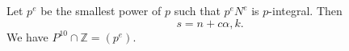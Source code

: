 Let $p^e$ be the smallest power of $p$ such that $p^e N^e$ is $p$-integral. Then
$$s = n + c\alpha, k.$$
We have $P^{10} \cap \mathbb{Z} = (p^e)$.
